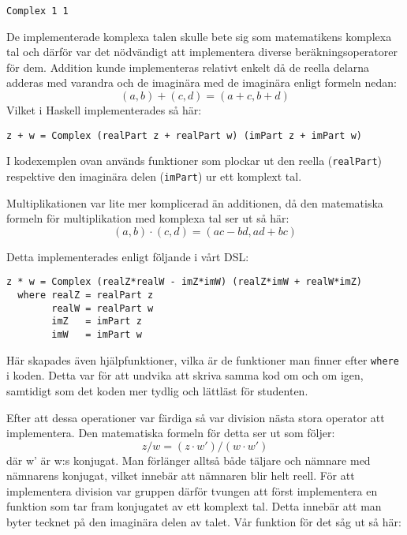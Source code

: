 \documentclass[]{article}
\begin{document}
\begin{verbatim}
Complex 1 1
\end{verbatim}

De implementerade komplexa talen skulle bete sig som matematikens komplexa tal
och därför var det nödvändigt att implementera diverse beräkningsoperatorer för dem.
Addition kunde implementeras relativt enkelt då de reella delarna adderas med
varandra och de imaginära med de imaginära enligt formeln nedan:
\[(a, b) + (c, d) = (a + c, b + d)\] \cite{conway1978functions}
Vilket i Haskell implementerades så här:
\begin{verbatim}
z + w = Complex (realPart z + realPart w) (imPart z + imPart w)
\end{verbatim}

I kodexemplen ovan används funktioner som plockar ut den reella
(\texttt{realPart}) respektive den imaginära delen
(\texttt{imPart}) ur ett komplext tal.




Multiplikationen var lite mer komplicerad än additionen, då den matematiska formeln för multiplikation med komplexa
tal ser ut så här:
 \[(a, b) \cdot (c, d) = (ac - bd, ad + bc) \] \cite{conway1978functions}

Detta implementerades enligt följande i vårt DSL:
\begin{verbatim}
z * w = Complex (realZ*realW - imZ*imW) (realZ*imW + realW*imZ)
  where realZ = realPart z
        realW = realPart w
        imZ   = imPart z
        imW   = imPart w
\end{verbatim}

Här skapades även hjälpfunktioner, vilka är de funktioner man finner efter \texttt{where}
i koden. Detta var för att undvika att skriva samma kod om och om igen, samtidigt som det koden mer tydlig och
lättläst för studenten.


Efter att dessa operationer var färdiga så var division nästa stora operator att implementera. Den matematiska formeln
för detta ser ut som följer:
\[ z / w = (z \cdot w') / (w \cdot w') \]
där w' är w:s konjugat.
Man förlänger alltså både täljare och nämnare med nämnarens konjugat, vilket innebär att nämnaren
blir helt reell. För att implementera division var gruppen därför tvungen att först implementera en
funktion som tar fram konjugatet av ett komplext tal. Detta innebär att man byter tecknet på den imaginära
delen av talet. Vår funktion för det såg ut så här:
\end{document}
